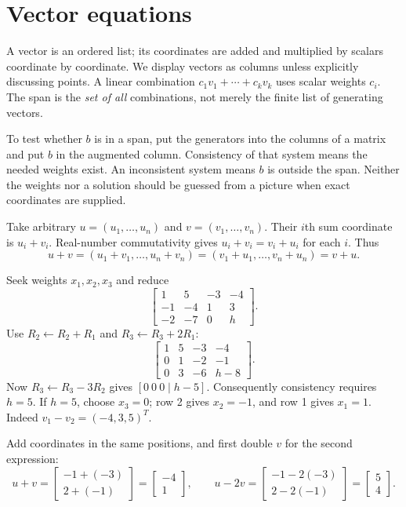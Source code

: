 \section{Vector equations}
A vector is an ordered list; its coordinates are added and multiplied by
scalars coordinate by coordinate. We display vectors as columns unless
explicitly discussing points. A linear combination $c_1v_1+\cdots+c_kv_k$
uses scalar weights $c_i$. The span is the \emph{set of all} combinations,
not merely the finite list of generating vectors.

To test whether $b$ is in a span, put the generators into the columns of
a matrix and put $b$ in the augmented column. Consistency of that system
means the needed weights exist. An inconsistent system means $b$ is
outside the span. Neither the weights nor a solution should be guessed
from a picture when exact coordinates are supplied.

Take arbitrary $u=(u_1,\ldots,u_n)$ and $v=(v_1,\ldots,v_n)$.
Their $i$th sum coordinate is $u_i+v_i$. Real-number commutativity gives
$u_i+v_i=v_i+u_i$ for each $i$. Thus
\[
u+v=(u_1+v_1,\ldots,u_n+v_n)
=(v_1+u_1,\ldots,v_n+u_n)=v+u.
\]

Seek weights $x_1,x_2,x_3$ and reduce
\[
\left[\begin{array}{rrr|r}1&5&-3&-4\\-1&-4&1&3\\-2&-7&0&h\end{array}\right].
\]
Use $R_2\leftarrow R_2+R_1$ and $R_3\leftarrow R_3+2R_1$:
\[
\left[\begin{array}{rrr|r}1&5&-3&-4\\0&1&-2&-1\\0&3&-6&h-8\end{array}\right].
\]
Now $R_3\leftarrow R_3-3R_2$ gives $[0\ 0\ 0\mid h-5]$.
Consequently consistency requires $h=5$. If $h=5$, choose $x_3=0$;
row 2 gives $x_2=-1$, and row 1 gives $x_1=1$. Indeed
$v_1-v_2=(-4,3,5)^T$.

Add coordinates in the same positions, and first double $v$ for the
second expression:
\[
u+v=\begin{bmatrix}-1+(-3)\\2+(-1)\end{bmatrix}
=\begin{bmatrix}-4\\1\end{bmatrix},\qquad
u-2v=\begin{bmatrix}-1-2(-3)\\2-2(-1)\end{bmatrix}
=\begin{bmatrix}5\\4\end{bmatrix}.
\]

